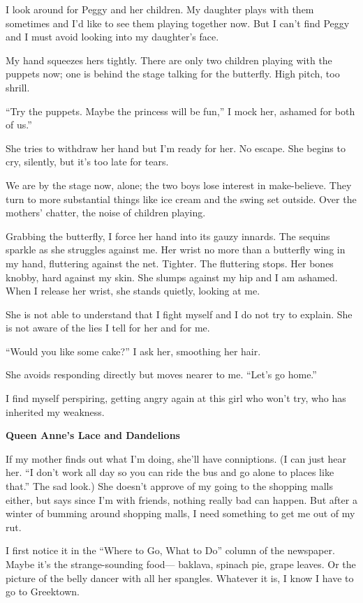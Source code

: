 \documentclass[
]{article}
\begin{document}
I look around for Peggy and her children. My daughter plays with them
sometimes and I'd like to see them playing together now. But I can't
find Peggy and I must avoid looking into my daughter's face.

My hand squeezes hers tightly. There are only two children playing with
the puppets now; one is behind the stage talking for the butterfly. High
pitch, too shrill.

``Try the puppets. Maybe the princess will be fun,'' I mock her, ashamed
for both of us.''

She tries to withdraw her hand but I'm ready for her. No escape. She
begins to cry, silently, but it's too late for tears.

We are by the stage now, alone; the two boys lose interest in
make-believe. They turn to more substantial things like ice cream and
the swing set outside. Over the mothers' chatter, the noise of chil­dren
playing.

Grabbing the butterfly, I force her hand into its gauzy innards. The
sequins sparkle as she struggles against me. Her wrist no more than a
butterfly wing in my hand, fluttering against the net. Tighter. The
fluttering stops. Her bones knobby, hard against my skin. She slumps
against my hip and I am ashamed. When I release her wrist, she stands
quietly, looking at me.

She is not able to understand that I fight myself and I do not try to
explain. She is not aware of the lies I tell for her and for me.

``Would you like some cake?'' I ask her, smoothing her hair.

She avoids responding directly but moves nearer to me. ``Let's go
home.''

I find myself perspiring, getting angry again at this girl who won't
try, who has inherited my weakness.

\textbf{\hfill\break
}

\textbf{Queen Anne's Lace and Dandelions}

If my mother finds out what I'm doing, she'll have conniptions. (I can
just hear her. ``I don't work all day so you can ride the bus and go
alone to places like that.'' The sad look.) She doesn't approve of my
going to the shopping malls either, but says since I'm with friends,
nothing really bad can happen. But after a winter of bumming around
shopping malls, I need something to get me out of my rut.

I first notice it in the ``Where to Go, What to Do'' column of the
newspaper. Maybe it's the strange-sounding food--- baklava, spinach pie,
grape leaves. Or the picture of the belly dancer with all her spangles.
Whatever it is, I know I have to go to Greektown.
\end{document}
